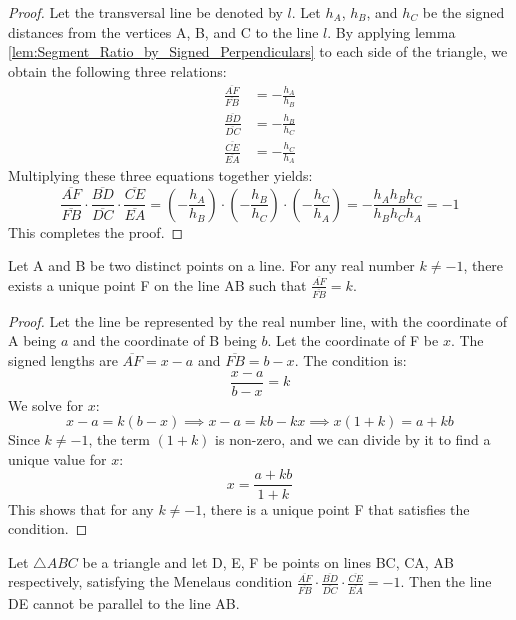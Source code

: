 \begin{proof}
    Let the transversal line be denoted by $l$. Let $h_A$, $h_B$, and $h_C$ be the signed distances from the vertices A, B, and C to the line $l$.
    By applying lemma \ref{lem:Segment_Ratio_by_Signed_Perpendiculars} to each side of the triangle, we obtain the following three relations:
    \begin{align*}
        \frac{\overline{AF}}{\overline{FB}} &= -\frac{h_A}{h_B} \\
        \frac{\overline{BD}}{\overline{DC}} &= -\frac{h_B}{h_C} \\
        \frac{\overline{CE}}{\overline{EA}} &= -\frac{h_C}{h_A}
    \end{align*}
    Multiplying these three equations together yields:
    $$ \frac{\overline{AF}}{\overline{FB}} \cdot \frac{\overline{BD}}{\overline{DC}} \cdot \frac{\overline{CE}}{\overline{EA}} = \left(-\frac{h_A}{h_B}\right) \cdot \left(-\frac{h_B}{h_C}\right) \cdot \left(-\frac{h_C}{h_A}\right) = - \frac{h_A h_B h_C}{h_B h_C h_A} = -1 $$
    This completes the proof.
\end{proof}

\begin{lemma}
    \label{lem:Uniqueness_of_Division_Point}
    Let A and B be two distinct points on a line. For any real number $k \neq -1$, there exists a unique point F on the line AB such that $\frac{\overline{AF}}{\overline{FB}} = k$.
\end{lemma}

\begin{proof}
    Let the line be represented by the real number line, with the coordinate of A being $a$ and the coordinate of B being $b$. Let the coordinate of F be $x$. The signed lengths are $\overline{AF} = x-a$ and $\overline{FB} = b-x$. The condition is:
    $$ \frac{x-a}{b-x} = k $$
    We solve for $x$:
    $$ x - a = k(b - x) \implies x - a = kb - kx \implies x(1+k) = a + kb $$
    Since $k \neq -1$, the term $(1+k)$ is non-zero, and we can divide by it to find a unique value for $x$:
    $$ x = \frac{a+kb}{1+k} $$
    This shows that for any $k \neq -1$, there is a unique point F that satisfies the condition.
\end{proof}

\begin{lemma}
    \label{lem:Non_Parallelism}
    Let $\triangle ABC$ be a triangle and let D, E, F be points on lines BC, CA, AB respectively, satisfying the Menelaus condition $\frac{\overline{AF}}{\overline{FB}} \cdot \frac{\overline{BD}}{\overline{DC}} \cdot \frac{\overline{CE}}{\overline{EA}} = -1$. Then the line DE cannot be parallel to the line AB.
\end{lemma}

